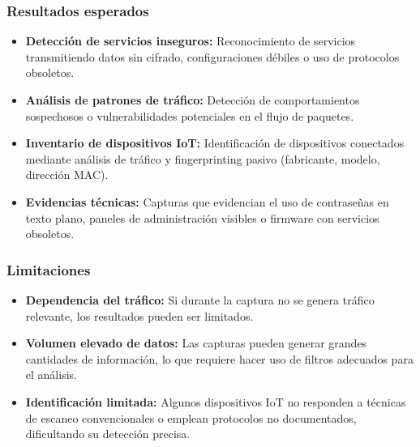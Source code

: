 \documentclass[a4paper, 11pt]{article}
\begin{document}
\subsubsection*{Resultados esperados}

\begin{itemize}
    \item \textbf{Detección de servicios inseguros:} Reconocimiento de servicios transmitiendo datos sin cifrado, configuraciones débiles o uso de protocolos obsoletos.
    
    \item \textbf{Análisis de patrones de tráfico:} Detección de comportamientos sospechosos o vulnerabilidades potenciales en el flujo de paquetes.

    \item \textbf{Inventario de dispositivos IoT:} Identificación de dispositivos conectados mediante análisis de tráfico y fingerprinting pasivo (fabricante, modelo, dirección MAC).

    \item \textbf{Evidencias técnicas:} Capturas que evidencian el uso de contraseñas en texto plano, paneles de administración visibles o firmware con servicios obsoletos.

\end{itemize}


\subsubsection*{Limitaciones}

\begin{itemize}
    \item \textbf{Dependencia del tráfico:} Si durante la captura no se genera tráfico relevante, los resultados pueden ser limitados.
        
    \item \textbf{Volumen elevado de datos:} Las capturas pueden generar grandes cantidades de información, lo que requiere hacer uso de filtros adecuados para el análisis.

    \item \textbf{Identificación limitada:} Algunos dispositivos IoT no responden a técnicas de escaneo convencionales o emplean protocolos no documentados, dificultando su detección precisa.

\end{itemize}
\end{document}
